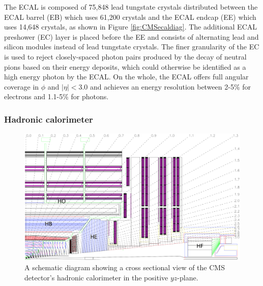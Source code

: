 The ECAL is composed of 75,848 lead tungstate crystals distributed between the ECAL barrel (EB) which uses 61,200 crystals and the ECAL endcap (EE) which uses 14,648 crystals, as shown in Figure \ref{fig:CMSecaldiag}. The additional ECAL preshower (EC) layer is placed before the EE and consists of alternating lead and silicon modules instead of lead tungstate crystals. The finer granularity of the EC is used to reject closely-spaced photon pairs produced by the decay of neutral pions based on their energy deposits, which could otherwise be identified as a high energy photon by the ECAL. On the whole, the ECAL offers full angular coverage in $\phi$ and $\left| \eta \right| < 3.0$ and achieves an energy resolution between 2-5\% for electrons and 1.1-5\% for photons.\cite{CMSECALPERF}

\subsubsection{Hadronic calorimeter}

\begin{figure}[htbp]
  \centering
    \includegraphics[width=5.5in]{images/hcal_diagram}
    \caption[Schematic for the CMS HCAL]{A schematic diagram showing a cross sectional view of the CMS detector's hadronic calorimeter in the positive $yz$-plane.\cite{HCALDIAGRAM}}
    \label{fig:CMShcaldiag}
\end{figure}

